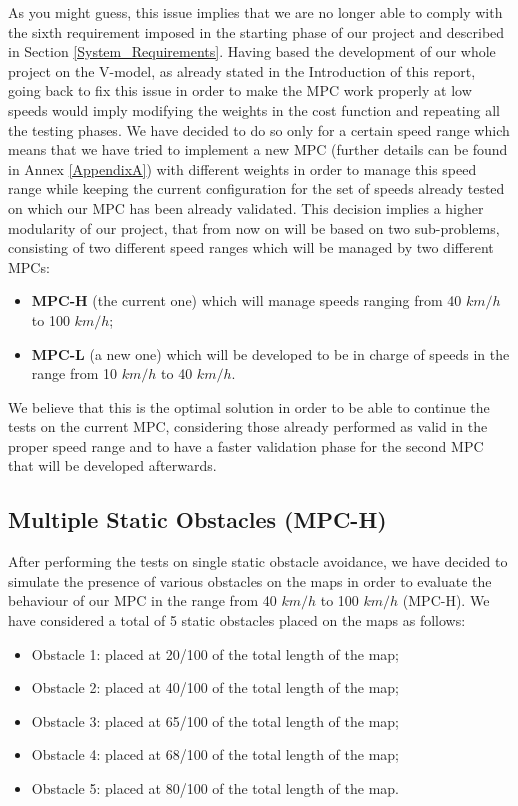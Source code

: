 \vspace{5mm}


As you might guess, this issue implies that we are no longer able to comply with the sixth requirement imposed in the starting phase of our project and described in Section \ref{System_Requirements}.
Having based the development of our whole project on the V-model, as already stated in the Introduction of this report, going back to fix this issue in order to make the MPC work properly at low speeds would imply modifying the weights in the cost function and repeating all the testing phases.
We have decided to do so only for a certain speed range which means that we have tried to implement a new MPC (further details can be found in Annex \ref{AppendixA}) with different weights in order to manage this speed range while keeping the current configuration for the set of speeds already tested on which our MPC has been already validated.
This decision implies a higher modularity of our project, that from now on will be based on two sub-problems, consisting of two different speed ranges which will be managed by two different MPCs: 
\begin{itemize}
    \item \textbf{MPC-H} (the current one) which will manage speeds ranging from 40 $km/h$ to 100 $km/h$;
    \item \textbf{MPC-L} (a new one) which will be developed to be in charge of speeds in the range from 10 $km/h$ to 40 $km/h$.
\end{itemize}

We believe that this is the optimal solution in order to be able to continue the tests on the current MPC, considering those already performed as valid in the proper speed range and to have a faster validation phase for the second MPC that will be developed afterwards.


\subsection{Multiple Static Obstacles (MPC-H)} \label{subsection:multiple_static}
After performing the tests on single static obstacle avoidance, we have decided to simulate the presence of various obstacles on the maps in order to evaluate the behaviour of our MPC in the range from 40 $km/h$ to 100 $km/h$ (MPC-H). We have considered a total of 5 static obstacles placed on the maps as follows:
\begin{itemize}
    \item Obstacle 1: placed at 20/100 of the total length of the map;
    \item Obstacle 2: placed at 40/100 of the total length of the map;
    \item Obstacle 3: placed at 65/100 of the total length of the map;
    \item Obstacle 4: placed at 68/100 of the total length of the map;
    \item Obstacle 5: placed at 80/100 of the total length of the map.
\end{itemize}


